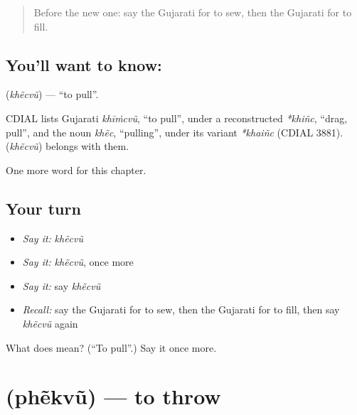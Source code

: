 \label{lesson:GU-C140-khecvu}



\begin{quote}
Before the new one: say the Gujarati for to sew, then the Gujarati for to fill.
\end{quote}

\subsection*{You'll want to know: }
\textbf{} (\emph{khẽcvũ}) — \textquotedblleft{}to pull\textquotedblright{}.

\begin{cousinweb}
CDIAL lists Gujarati \emph{khīṁcvũ}, \textquotedblleft{}to pull\textquotedblright{}, under a reconstructed \emph{*khiñc}, \textquotedblleft{}drag, pull\textquotedblright{}, and the noun \emph{khẽc}, \textquotedblleft{}pulling\textquotedblright{}, under its variant \emph{*khaiñc} (CDIAL 3881). \textbf{} (\emph{khẽcvũ}) belongs with them.
\end{cousinweb}

\begin{grammarlens}[title={What you've built}]
One more word for this chapter.
\end{grammarlens}

\subsection*{Your turn}
\begin{itemize}
\raggedright
  \item \emph{Say it:} \emph{khẽcvũ}
  \item \emph{Say it:} \emph{khẽcvũ}, once more
  \item \emph{Say it:} say \emph{khẽcvũ}
  \item \emph{Recall:} say the Gujarati for to sew, then the Gujarati for to fill, then say \emph{khẽcvũ} again
\end{itemize}

\begin{tcolorbox}[breakable,colback=teal!4,colframe=teal!35!black,title={Before you move on}]
What does  mean? (\textquotedblleft{}To pull\textquotedblright{}.) Say it once more.
\end{tcolorbox}
\section[\texorpdfstring{\gu{ફેંકવું} (phẽkvũ)}{ફેંકવું (phẽkvũ)}]{ (phẽkvũ) — to throw}

